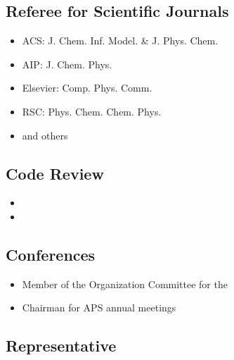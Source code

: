 \documentclass{article}
\begin{document}
\subsection*{Referee for Scientific Journals}

\begin{itemize}
\setlength{\itemsep}{0pt}
\setlength{\parskip}{0pt}
\setlength{\parsep}{0pt}
\item ACS: J. Chem. Inf. Model. \& J. Phys. Chem.
\item AIP: J. Chem. Phys.
\item Elsevier: Comp. Phys. Comm.
\item RSC: Phys. Chem. Chem. Phys.
\item and others
\end{itemize}

\vspace{3mm}
\subsection*{Code Review}

\begin{itemize}
\setlength{\itemsep}{0pt}
\setlength{\parskip}{0pt}
\setlength{\parsep}{0pt}
\item {}
\item {}
\end{itemize}

\subsection*{Conferences}

\begin{itemize}
\setlength{\itemsep}{0pt}
\setlength{\parskip}{0pt}
\setlength{\parsep}{0pt}
\item Member of the Organization Committee for the 
\item Chairman for APS annual meetings
\end{itemize}

\subsection*{Representative}
\end{document}
